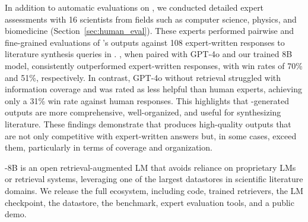 In addition to automatic evaluations on \data, we conducted detailed expert assessments with 16 scientists from fields such as computer science, physics, and biomedicine (Section~\ref{sec:human_eval}). These experts performed pairwise and fine-grained evaluations of \model's outputs against 108 expert-written responses to literature synthesis queries in \data. 
\model, when paired with GPT-4o and our trained 8B model, consistently outperformed expert-written responses, with win rates of 70\% and 51\%, respectively. 
In contrast, GPT-4o without retrieval struggled with information coverage and was rated as less helpful than human experts, achieving only a 31\% win rate against human responses.  
This highlights that \model-generated outputs are more comprehensive, well-organized, and useful for synthesizing literature.
These findings demonstrate that \model produces high-quality outputs that are not only competitive with expert-written answers but, in some cases, exceed them, particularly in terms of coverage and organization.

\model-8B is an open retrieval-augmented LM that avoids reliance on proprietary LMs or retrieval systems, leveraging one of the largest datastores in scientific literature domains. 
We release the full \model ecosystem, including code, trained retrievers, the LM checkpoint, the datastore, the \data benchmark, expert evaluation tools, and a public demo.
